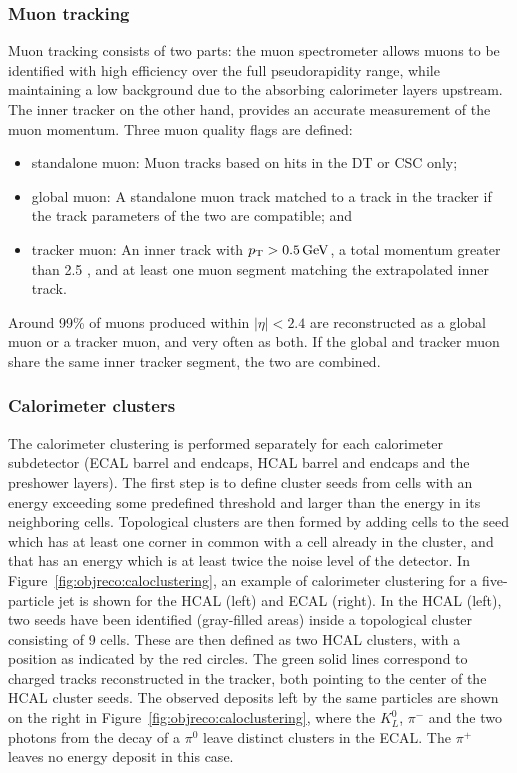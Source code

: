 \subsubsection{Muon tracking}
\label{subsub:objreco:muontracking}
Muon tracking consists of two parts: the muon spectrometer allows muons to be identified with high efficiency over the full pseudorapidity range, while maintaining a low background due to the absorbing calorimeter layers upstream. The inner tracker on the other hand, provides an accurate measurement of the muon momentum. Three muon quality flags are defined:
\begin{itemize}
  \itemsep0em 
  \item standalone muon: Muon tracks based on hits in the DT or CSC only;
  \item global muon: A standalone muon track matched to a track in the tracker if the track parameters of the two are compatible; and
  \item tracker muon: An inner track with $p_{\mathrm{T}}> 0.5 \,\text{Ge\hspace{-.08em}V}$, a total momentum greater than 2.5 \GeV, and at least one muon segment matching the extrapolated inner track.
\end{itemize}
Around 99\% of muons produced within $|\eta|<2.4$ are reconstructed as a global muon or a tracker muon, and very often as both. If the global and tracker muon share the same inner tracker segment, the two are combined.

\subsubsection{Calorimeter clusters}
 The calorimeter clustering is performed separately for each calorimeter subdetector (ECAL barrel and endcaps, HCAL barrel and endcaps and the preshower layers).
The first step is to define cluster seeds from cells with an energy exceeding some predefined threshold and larger than the energy in its neighboring cells. Topological clusters are then formed by adding cells to the seed which has at least one corner in common with a cell already in the cluster, and that has an energy which is at least twice the noise level of the detector. In Figure~\ref{fig:objreco:caloclustering}, an example of calorimeter clustering for a five-particle jet is shown for the HCAL (left) and ECAL (right). In the HCAL (left), two seeds have been identified (gray-filled areas) inside a topological cluster consisting of 9 cells. These are then defined as two HCAL clusters, with a position as indicated by the red circles. The green solid lines correspond to charged tracks reconstructed in the tracker, both pointing to the center of the HCAL cluster seeds. The observed deposits left by the same particles are shown on the right in Figure~\ref{fig:objreco:caloclustering}, where the $K^0_L$, $\pi^-$ and the two photons from the decay of a $\pi^0$ leave distinct clusters in the ECAL. The $\pi^+$ leaves no energy deposit in this case. 

